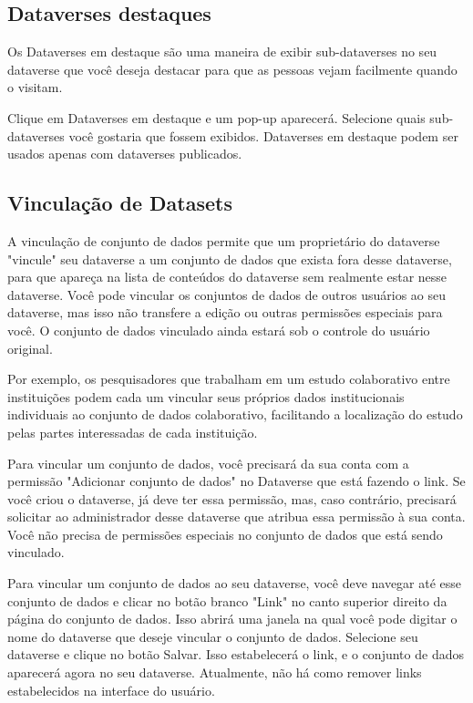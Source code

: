 \documentclass[12pt,hidelinks]{article}
\begin{document}
    \subsection{Dataverses destaques}
    
\qquad Os Dataverses em destaque são uma maneira de exibir sub-dataverses no seu dataverse que você deseja destacar para que as pessoas vejam facilmente quando o visitam.

Clique em Dataverses em destaque e um pop-up aparecerá. Selecione quais sub-dataverses você gostaria que fossem exibidos. Dataverses em destaque podem ser usados apenas com dataverses publicados.
    
    \subsection{Vinculação de Datasets}
    
\qquad A vinculação de conjunto de dados permite que um proprietário do dataverse "vincule" seu dataverse a um conjunto de dados que exista fora desse dataverse, para que apareça na lista de conteúdos do dataverse sem realmente estar nesse dataverse. Você pode vincular os conjuntos de dados de outros usuários ao seu dataverse, mas isso não transfere a edição ou outras permissões especiais para você. O conjunto de dados vinculado ainda estará sob o controle do usuário original.

Por exemplo, os pesquisadores que trabalham em um estudo colaborativo entre instituições podem cada um vincular seus próprios dados institucionais individuais ao conjunto de dados colaborativo, facilitando a localização do estudo pelas partes interessadas de cada instituição.

Para vincular um conjunto de dados, você precisará da sua conta com a permissão "Adicionar conjunto de dados" no Dataverse que está fazendo o link. Se você criou o dataverse, já deve ter essa permissão, mas, caso contrário, precisará solicitar ao administrador desse dataverse que atribua essa permissão à sua conta. Você não precisa de permissões especiais no conjunto de dados que está sendo vinculado.

Para vincular um conjunto de dados ao seu dataverse, você deve navegar até esse conjunto de dados e clicar no botão branco "Link" no canto superior direito da página do conjunto de dados. Isso abrirá uma janela na qual você pode digitar o nome do dataverse que deseje vincular o conjunto de dados. Selecione seu dataverse e clique no botão Salvar. Isso estabelecerá o link, e o conjunto de dados aparecerá agora no seu dataverse. Atualmente, não há como remover links estabelecidos na interface do usuário.
    
\end{document}
